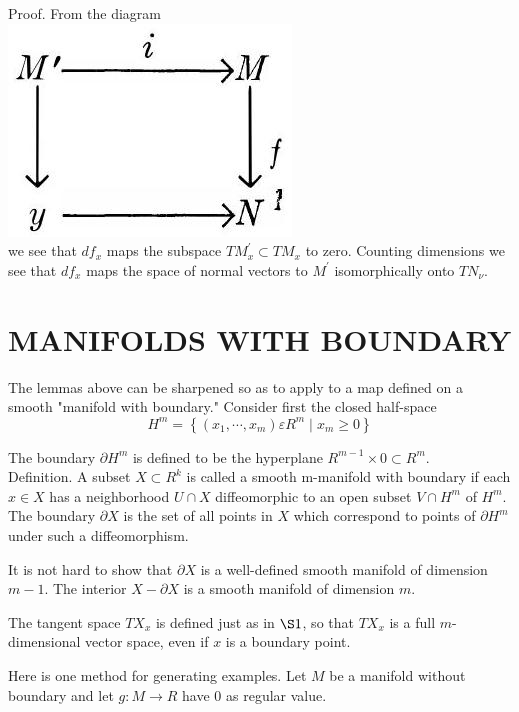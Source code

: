 \documentclass[10pt, letterpaper]{article}
\begin{document}
Proof. From the diagram\\
\includegraphics[scale=0.2, center]{2025_05_28_7c9927389b272ddbc2c3g-23}\\
we see that $d f_{x}$ maps the subspace $T M_{x}^{\prime} \subset T M_{x}$ to zero. Counting dimensions we see that $d f_{x}$ maps the space of normal vectors to $M^{\prime}$ isomorphically onto $T N_{\nu}$.


\pagebreak

\section*{MANIFOLDS WITH BOUNDARY}

The lemmas above can be sharpened so as to apply to a map defined on a smooth "manifold with boundary." Consider first the closed half-space
$$
H^{m}=\left\{\left(x_{1}, \cdots, x_{m}\right) \varepsilon R^{m} \mid x_{m} \geq 0\right\}
$$

The boundary $\partial H^{m}$ is defined to be the hyperplane $R^{m-1} \times 0 \subset R^{m}$.\\
Definition. A subset $X \subset R^{k}$ is called a smooth m-manifold with boundary if each $x \in X$ has a neighborhood $U \cap X$ diffeomorphic to an open subset $V \cap H^{m}$ of $H^{m}$. The boundary $\partial X$ is the set of all points in $X$ which correspond to points of $\partial H^{m}$ under such a diffeomorphism.

It is not hard to show that $\partial X$ is a well-defined smooth manifold of dimension $m-1$. The interior $X-\partial X$ is a smooth manifold of dimension $m$.

The tangent space $T X_{x}$ is defined just as in $\S 1$, so that $T X_{x}$ is a full $m$-dimensional vector space, even if $x$ is a boundary point.

Here is one method for generating examples. Let $M$ be a manifold without boundary and let $g: M \rightarrow R$ have 0 as regular value.
\end{document}
